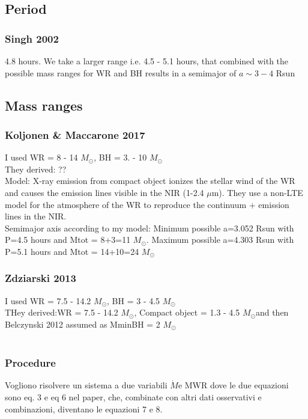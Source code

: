 \documentclass[a4paper,titlepage]{book}     	%
\newcommand{\sun}{\ensuremath{_\odot}}
\newcommand{\mdot}{\ensuremath{\dot{M}}}
\newcommand{\msun}{\ensuremath{M\sun}}
\begin{document}
\subsection{Period}
\subsubsection{Singh 2002} 4.8 hours. We take a larger range i.e. 4.5 - 5.1 hours, that combined with the possible mass ranges for WR and BH results in a semimajor of $a \sim 3-4 $ Rsun


\subsection{Mass ranges}
\subsubsection{Koljonen \& Maccarone 2017} I used WR = 8 - 14 \msun, BH = 3. - 10 \msun \\

They derived: ?? \\

Model: X-ray emission from compact object ionizes the stellar wind of the WR and causes the emission lines visible in the NIR (1-2.4 $\mu$m). They use a non-LTE model for the atmosphere of the WR to reproduce the continuum + emission lines in the NIR. \\

Semimajor axis according to my model: Minimum possible a=3.052 Rsun with P=4.5 hours and Mtot = 8+3=11 \msun .  Maximum possible a=4.303 Rsun with P=5.1 hours and Mtot = 14+10=24 \msun 


\subsubsection{Zdziarski 2013} \cite{Cyg-X3_Zd2013} I used WR = 7.5 - 14.2 \msun, BH = 3 - 4.5 \msun \\

THey derived:WR = 7.5 - 14.2 \msun, Compact object = 1.3 - 4.5 \msun and then Belczynski 2012 assumed as MminBH = 2 \msun\\
\\

\subsubsection{Procedure}
Vogliono risolvere un sistema a due variabili \mdot e MWR dove le due equazioni sono eq. 3 e eq 6 nel paper, che, combinate con altri dati osservativi e combinazioni, diventano le equazioni 7 e 8.
\end{document}
